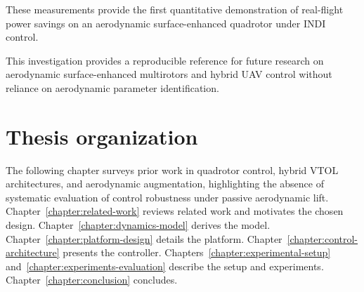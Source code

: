 These measurements provide the first quantitative demonstration of real-flight power savings on an aerodynamic surface-enhanced quadrotor under INDI control.

This investigation provides a reproducible reference for future research on aerodynamic surface-enhanced multirotors and hybrid UAV control without reliance on aerodynamic parameter identification.

\section{Thesis organization}
The following chapter surveys prior work in quadrotor control, hybrid VTOL architectures, and aerodynamic augmentation, highlighting the absence of systematic evaluation of control robustness under passive aerodynamic lift. Chapter~\ref{chapter:related-work} reviews related work and motivates the chosen design. Chapter~\ref{chapter:dynamics-model} derives the model. Chapter~\ref{chapter:platform-design} details the platform. Chapter~\ref{chapter:control-architecture} presents the controller. Chapters~\ref{chapter:experimental-setup} and~\ref{chapter:experiments-evaluation} describe the setup and experiments. Chapter~\ref{chapter:conclusion} concludes.
